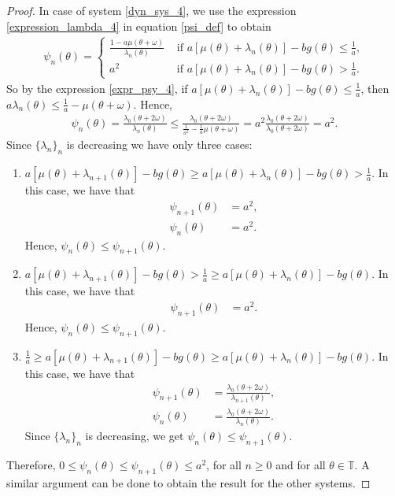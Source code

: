 \documentclass[12pt]{article}
\newcommand{\T}{\mathbb{T}}
\theoremstyle{plain}
\theoremstyle{remark}
\theoremstyle{definition}
\begin{document}
\begin{proof}
    In case of system \eqref{dyn_sys_4}, we use the expression \eqref{expression_lambda_4} in equation \eqref{psi_def} to obtain
    \begin{align}\label{expr_psy_4}
        \psi_n(\theta)=
        \begin{cases}
            \frac{1 - a\mu(\theta+\omega)}{\lambda_n(\theta)} &\text{ if }a[\mu(\theta)+\lambda_n(\theta)] - b g(\theta)\leq\frac{1}{a},\\
            a^2 &\text{ if }a[\mu(\theta)+\lambda_n(\theta)] - b g(\theta)>\frac{1}{a}.
        \end{cases}
    \end{align}
    So by the expression \eqref{expr_psy_4}, if $a[\mu(\theta)+\lambda_n(\theta)] - b g(\theta)\leq\frac{1}{a}$, then $a\lambda_n(\theta)\leq \frac{1}{a}-\mu(\theta+\omega)$. Hence,
    \begin{align*}
        \psi_n(\theta) = \frac{\lambda_{0}(\theta+2\omega)}{\lambda_n(\theta)} \leq \frac{\lambda_{0}(\theta+2\omega)}{\frac{1}{a^2}-\frac{1}{a}\mu(\theta+\omega)} = a^2\frac{\lambda_{0}(\theta+2\omega)}{\lambda_{0}(\theta+2\omega)} = a^2.
    \end{align*}
    Since $\{\lambda_n\}_n$ is decreasing we have only three cases:
    \begin{enumerate}
        \item $a[\mu(\theta)+\lambda_{n+1}(\theta)] - b g(\theta)\geq a[\mu(\theta)+\lambda_n(\theta)] - b g(\theta)>\frac{1}{a}$. In this case, we have that
            \begin{align*}
                \psi_{n+1}(\theta) &= a^2,\\
                \psi_n(\theta) &= a^2.
            \end{align*}
            Hence, $\psi_{n}(\theta) \leq \psi_{n+1}(\theta)$.
            
        \item $a[\mu(\theta)+\lambda_{n+1}(\theta)] - b g(\theta)>\frac{1}{a}\geq a[\mu(\theta)+\lambda_n(\theta)] - b g(\theta)$. In this case, we have that
            \begin{align*}
                \psi_{n+1}(\theta) &= a^2.
            \end{align*}
            Hence, $\psi_{n}(\theta) \leq \psi_{n+1}(\theta)$.         
        \item $\frac{1}{a}\geq a[\mu(\theta)+\lambda_{n+1}(\theta)] - b g(\theta)\geq a[\mu(\theta)+\lambda_n(\theta)] - b g(\theta)$. In this case, we have that
            \begin{align*}
                \psi_{n+1}(\theta) &= \frac{\lambda_{0}(\theta+2\omega)}{\lambda_{n+1}(\theta)},\\
                \psi_n(\theta) &= \frac{\lambda_{0}(\theta+2\omega)}{\lambda_n(\theta)}.
            \end{align*}
            Since $\{\lambda_n\}_n$ is decreasing, we get $\psi_{n}(\theta) \leq \psi_{n+1}(\theta)$.
    \end{enumerate}
    Therefore, $0\leq \psi_{n}(\theta) \leq \psi_{n+1}(\theta)\leq a^2$, for all $n\geq0$ and for all $\theta\in\T$. A similar argument can be done to obtain the result for the other systems.
\end{proof}
\end{document}
